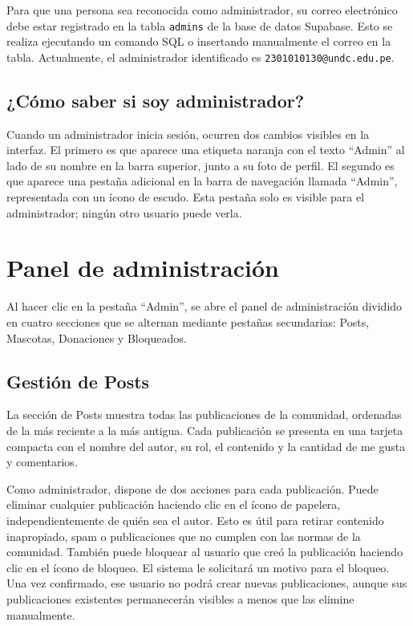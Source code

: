 \documentclass[12pt,a4paper]{article}
\begin{document}
Para que una persona sea reconocida como administrador, su correo electrónico debe estar registrado en la tabla \texttt{admins} de la base de datos Supabase. Esto se realiza ejecutando un comando SQL o insertando manualmente el correo en la tabla. Actualmente, el administrador identificado es \texttt{2301010130@undc.edu.pe}.

\subsection{¿Cómo saber si soy administrador?}

Cuando un administrador inicia sesión, ocurren dos cambios visibles en la interfaz. El primero es que aparece una etiqueta naranja con el texto ``Admin'' al lado de su nombre en la barra superior, junto a su foto de perfil. El segundo es que aparece una pestaña adicional en la barra de navegación llamada ``Admin'', representada con un ícono de escudo. Esta pestaña solo es visible para el administrador; ningún otro usuario puede verla.

\section{Panel de administración}

Al hacer clic en la pestaña ``Admin'', se abre el panel de administración dividido en cuatro secciones que se alternan mediante pestañas secundarias: Posts, Mascotas, Donaciones y Bloqueados.

\subsection{Gestión de Posts}

La sección de Posts muestra todas las publicaciones de la comunidad, ordenadas de la más reciente a la más antigua. Cada publicación se presenta en una tarjeta compacta con el nombre del autor, su rol, el contenido y la cantidad de me gusta y comentarios.

Como administrador, dispone de dos acciones para cada publicación. Puede eliminar cualquier publicación haciendo clic en el ícono de papelera, independientemente de quién sea el autor. Esto es útil para retirar contenido inapropiado, spam o publicaciones que no cumplen con las normas de la comunidad. También puede bloquear al usuario que creó la publicación haciendo clic en el ícono de bloqueo. El sistema le solicitará un motivo para el bloqueo. Una vez confirmado, ese usuario no podrá crear nuevas publicaciones, aunque sus publicaciones existentes permanecerán visibles a menos que las elimine manualmente.
\end{document}
